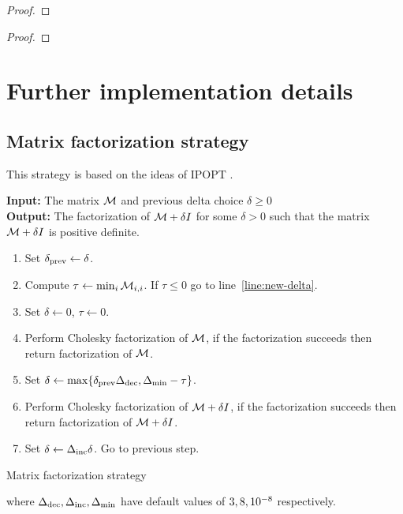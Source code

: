 \documentclass{article}
\begin{document}
\begin{proof}

\end{proof}

\thmSuperlinear*

\begin{proof}

\end{proof}

\fi

\section{Further implementation details}

\subsection{Matrix factorization strategy}\label{sec:mat-fact}


This strategy is based on the ideas of IPOPT \cite[Algorithm IC]{wachter2006implementation}.

\begin{algorithm}[H]
\textbf{Input:} The matrix $\mathcal{M}$ and previous delta choice $\delta \ge 0$ \\
\textbf{Output:} The factorization of $\mathcal{M} +  \delta I$ for some $\delta > 0$ such that the matrix $\mathcal{M} +  \delta I$ is positive definite.
\begin{enumerate}[label*=A.{\arabic*}]
\item Set $\delta_{\text{prev}} \gets \delta$.
\item Compute $\tau \gets \min_i \mathcal{M}_{i,i}$. If $\tau \le 0$ go to line~\ref{line:new-delta}.
\item Set $\delta \gets 0$, $\tau \gets 0$.
\item Perform Cholesky factorization of $\mathcal{M}$, if the factorization succeeds then return factorization of $\mathcal{M}$.
\item\label{line:new-delta} Set $\delta \gets \max\{ \delta_{\text{prev}} \Delta_{\text{dec}}, \Delta_{\min} - \tau \}$.
\item Perform Cholesky factorization of $\mathcal{M} + \delta I$,  if the factorization succeeds then return factorization of $\mathcal{M} + \delta I$.
\item Set $\delta \gets \Delta_{\text{inc}} \delta$. Go to previous step.
\end{enumerate}
\caption{Matrix factorization strategy}\label{alg:mat-fact}
\end{algorithm}
where $\Delta_{\text{dec}}, \Delta_{\text{inc}}, \Delta_{\min}$ have default values of $3, 8, 10^{-8}$ respectively.
\end{document}
